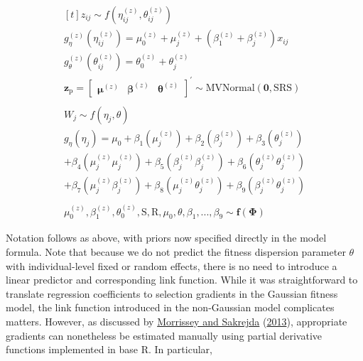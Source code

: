 \documentclass{article}
\begin{document}
\begin{equation} \tag{2}\label{eq:2}
\begin{gathered}[t]
z_{ij} \sim f \left(\eta^{(z)}_{ij }, \theta^{(z)}_{ij} \right)  \\
g_\eta^{(z)} \left( \eta^{(z)}_{ij} \right) = \mu_0^{(z)} + \mu_j^{(z)}+ \left(\beta_1^{(z)} + \beta_j^{(z)} \right) x_{ij} \nonumber \\
g_\theta^{(z)} \left( \theta^{(z)}_{ij} \right) = \theta_0^{(z)} + \theta_{j}^{(z)} \nonumber \\
\boldsymbol{z_{\mathrm{p}}} = \begin{bmatrix}
\boldsymbol{\mu}^{(z)} &
\boldsymbol{\beta}^{(z)} &
\boldsymbol{\theta}^{(z)} \end{bmatrix} ^{\prime}
 \sim \mathrm{M}\mathrm{VNormal} \left(
\boldsymbol{0},\boldsymbol{\mathrm{S}}\boldsymbol{\mathrm{R}}\boldsymbol{\mathrm{S}} \right) \nonumber \\ 
\nonumber \\
W_{j} \sim f \left(\eta_{j}, \theta \right)   \nonumber \\
g_\eta \left( \eta_{j} \right)  = \mu_0 + \beta_1 \left( \mu^{(z)}_{j} \right) + 
                \beta_2 \left( \beta_j^{(z)} \right) + 
                \beta_3 \left( \theta^{(z)}_{j} \right)  \nonumber  \\ 
                + \beta_4 \left( \mu^{(z)}_j \mu^{(z)}_j \right) +
                \beta_5\left( \beta^{(z)}_j \beta^{(z)}_j \right) +
                \beta_6 \left( \theta^{(z)}_j \theta^{(z)}_j \right)\\ 
                +  \beta_7 \left( \mu^{(z)}_j \beta^{(z)}_j \right) + 
                \beta_8 \left( \mu^{(z)}_j \theta^{(z)}_j \right) + 
                 \beta_9 \left( \beta^{(z)}_j \theta^{(z)}_j \right) \nonumber \\ \nonumber \\ 
\mu_0^{(z)},\beta_1^{(z)}, \theta_0^{(z)}, \boldsymbol{\mathrm{S}}, \boldsymbol{\mathrm{R}}, \mu_0, \theta, \beta_1, ... , \beta_9
\sim \boldsymbol{f}(\boldsymbol{\Phi}) \nonumber 
\end{gathered}
\end{equation}

Notation follows as above, with priors now specified directly in the
model formula. Note that because we do not predict the fitness
dispersion parameter \(\theta\) with individual-level fixed or random
effects, there is no need to introduce a linear predictor and
corresponding link function. While it was straightforward to translate
regression coefficients to selection gradients in the Gaussian fitness
model, the link function introduced in the non-Gaussian model
complicates matters. However, as discussed by
\protect\hyperlink{ref-Morrissey2013}{Morrissey and Sakrejda}
(\protect\hyperlink{ref-Morrissey2013}{2013}), appropriate gradients can
nonetheless be estimated manually using partial derivative functions
implemented in base R. In particular,
\end{document}
